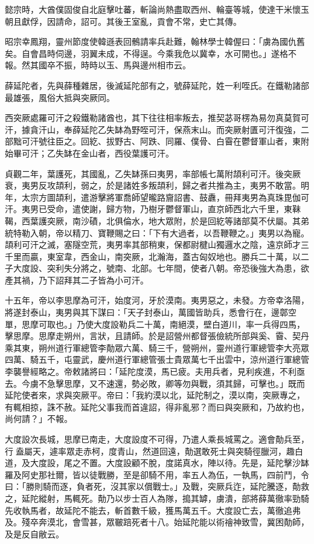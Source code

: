 \begin{pinyinscope}
 懿宗時，大酋僕固俊自北庭擊吐蕃，斬論尚熱盡取西州、輪臺等城，使達干米懷玉朝且獻俘，因請命，詔可。其後王室亂，貢會不常，史亡其傳。



 昭宗幸鳳翔，靈州節度使韓遜表回鶻請率兵赴難，翰林學士韓偓曰：「虜為國仇舊矣。自會昌時伺邊，羽翼未成，不得逞。今乘我危以冀幸，水可開也。」遂格不報。然其國卒不振，時時以玉、馬與邊州相市云。



 薛延陀者，先與薛種雜居，後滅延陀部有之，號薛延陀，姓一利咥氏。在鐵勒諸部最雄張，風俗大抵與突厥同。



 西突厥處羅可汗之殺鐵勒諸酋也，其下往往相率叛去，推契苾哥楞為易勿真莫賀可汗，據貪汗山，奉薛延陀乙失缽為野咥可汗，保燕末山。而突厥射匱可汗復強，二部黜可汗號往臣之。回紇、拔野古、阿跌、同羅、僕骨、白霫在鬱督軍山者，東附始畢可汗；乙失缽在金山者，西役葉護可汗。



 貞觀二年，葉護死，其國亂，乙失缽孫曰夷男，率部帳七萬附頡利可汗。後突厥衰，夷男反攻頡利，弱之，於是諸姓多叛頡利，歸之者共推為主，夷男不敢當。明年，太宗方圖頡利，遣游擊將軍喬師望曨路齎詔書、鼓纛，冊拜夷男為真珠毘伽可汗。夷男已受命，遣使謝，歸方物，乃樹牙鬱督軍山，直京師西北六千里，東靺鞨，西葉護突厥，南沙磧，北俱倫水，地大眾附，於是回紇等諸部莫不伏屬。其弟統特勒入朝，帝以精刀、寶鞭賜之曰：「下有大過者，以吾鞭鞭之。」夷男以為寵。頡利可汗之滅，塞隧空荒，夷男率其部稍東，保都尉楗山獨邏水之陰，遠京師才三千里而贏，東室韋，西金山，南突厥，北瀚海，蓋古匈奴地也。勝兵二十萬，以二子大度設、突利失分將之，號南、北部。七年間，使者八朝。帝恐後強大為患，欲產其禍，乃下詔拜其二子皆為小可汗。



 十五年，帝以李思摩為可汗，始度河，牙於漠南。夷男惡之，未發。方帝幸洛陽，將遂封泰山，夷男與其下謀曰：「天子封泰山，萬國皆助兵，悉會行在，邊鄣空單，思摩可取也。」乃使大度設勒兵二十萬，南絕漠，壁白道川，率一兵得四馬，擊思摩。思摩走朔州，言狀，且請師。於是詔營州都督張儉統所部與奚、霫、契丹乘其東，朔州道行軍總管李勣眾六萬、騎三千，營朔州，靈州道行軍總管李大亮眾四萬、騎五千，屯靈武，慶州道行軍總管張士貴眾萬七千出雲中，涼州道行軍總管李襲譽經略之。帝敕諸將曰：「延陀度漠，馬已疲。夫用兵者，見利疾進，不利亟去。今虜不急擊思摩，又不速還，勢必敗，卿等勿與戰，須其歸，可擊也。」既而延陀使者來，求與突厥平。帝曰：「我約漠以北，延陀制之，漠以南，突厥專之，有輒相掠，誅不赦。延陀父事我而首違詔，得非亂邪？而曰與突厥和，乃故約也，尚何請？」不報。



 大度設次長城，思摩已南走，大度設度不可得，乃遣人乘長城罵之。適會勣兵至，行盍屬天，遽率眾走赤柯，度青山，然道回遠，勣選敢死士與突騎徑臘河，趣白道，及大度設，尾之不置。大度設顧不脫，度諾真水，陣以待。先是，延陀擊沙缽羅及阿史那社爾，皆以徒戰勝，至是卻騎不用，率五人為伍，一執馬，四前鬥，令曰：「勝則騎而逐，負者死，沒其家以償戰士。」及戰，突厥兵迮，延陀騰逐，勣救之，延陀縱射，馬輒死。勣乃以步士百人為隊，搗其罅，虜潰，部將薛萬徹率勁騎先收執馬者，故延陀不能去，斬首數千級，獲馬萬五千。大度設亡去，萬徹追弗及。殘卒奔漠北，會雪甚，眾皸踣死者十八。始延陀能以術禬神致雪，冀困勣師，及是反自敝云。




\end{pinyinscope}

